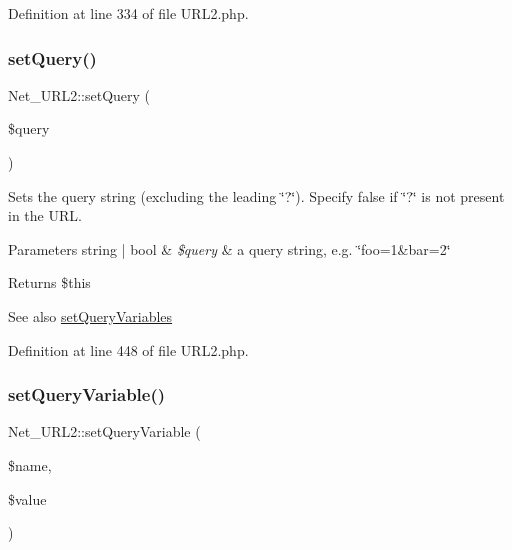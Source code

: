 Definition at line 334 of file U\+R\+L2.\+php.

\mbox{\label{classNet__URL2_a8ef0c4583fcbc47e980f5facadc96295}} 
\subsubsection{\texorpdfstring{set\+Query()}{setQuery()}}
{\footnotesize\ttfamily Net\+\_\+\+U\+R\+L2\+::set\+Query (\begin{DoxyParamCaption}\item[{}]{\$query }\end{DoxyParamCaption})}

Sets the query string (excluding the leading \char`\"{}?\char`\"{}). Specify false if \char`\"{}?\char`\"{} is not present in the U\+RL.


\begin{DoxyParams}[1]{Parameters}
string | bool & {\em \$query} & a query string, e.\+g. \char`\"{}foo=1\&bar=2\char`\"{}\\
\hline
\end{DoxyParams}
\begin{DoxyReturn}{Returns}
\$this 
\end{DoxyReturn}
\begin{DoxySeeAlso}{See also}
\hyperlink{classNet__URL2_a2b93dbf912e578998c7447788400cc07}{set\+Query\+Variables} 
\end{DoxySeeAlso}


Definition at line 448 of file U\+R\+L2.\+php.

\mbox{\label{classNet__URL2_a30d2d35e20ee1391db08c5ab74ffb262}} 
\subsubsection{\texorpdfstring{set\+Query\+Variable()}{setQueryVariable()}}
{\footnotesize\ttfamily Net\+\_\+\+U\+R\+L2\+::set\+Query\+Variable (\begin{DoxyParamCaption}\item[{}]{\$name,  }\item[{}]{\$value }\end{DoxyParamCaption})}

